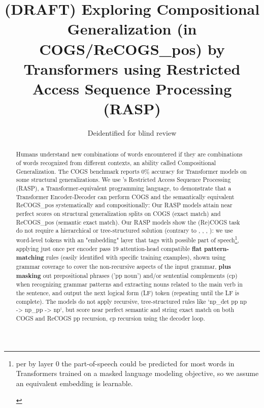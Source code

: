 \documentclass[11pt]{article}
\title{(DRAFT) Exploring Compositional Generalization (in COGS/ReCOGS\_pos) by Transformers using Restricted Access Sequence Processing (RASP)}
\author{Deidentified for blind review}
\begin{document}
\maketitle
\begin{abstract}
Humans understand new combinations of words encountered if they are combinations of words recognized from different contexts, an ability called Compositional Generalization.
The COGS benchmark \cite{KimLinzen2020} reports 0\% accuracy for Transformer models on some structural generalizations.
We use \cite{Weiss2021}'s Restricted Access Sequence Processing (RASP), a Transformer-equivalent programming language, to demonstrate that a Transformer Encoder-Decoder can perform COGS and the semantically equivalent ReCOGS\_pos\cite{Wu2023} systematically and compositionally: Our RASP models attain near perfect scores on structural generalization splits on COGS (exact match) and ReCOGS\_pos (semantic exact match).
Our RASP models show the (Re)COGS task do not require a hierarchical or tree-structured solution (contrary to \cite{KimLinzen2020}, \cite{yao-koller-2022-structural}, \cite{murty2022characterizingintrinsiccompositionalitytransformers}, \cite{liu-etal-2021-learning-algebraic}): we use word-level tokens with an "embedding" layer that tags with possible part of speech\footnote{\begin{footnotesize}per \cite{tenney2019bertrediscoversclassicalnlp} by layer 0 the part-of-speech could be predicted for most words in Transformers trained on a masked language modeling objective, so we assume an equivalent embedding is learnable.\end{footnotesize}}, applying just once per encoder pass 19 attention-head compatible \textbf{flat pattern-matching} rules (easily identified with specific training examples), shown using grammar coverage \cite{fuzzingbook2023:GrammarCoverageFuzzer} to cover the non-recursive aspects of the input grammar, \textbf{plus masking} out prepositional phrases ('pp noun') and/or sentential complements (cp) when recognizing grammar patterns and extracting nouns related to the main verb in the sentence, and output the next logical form (LF) token (repeating until the LF is complete). The models do not apply recursive, tree-structured rules like `np\_det pp np -> np\_pp -> np`, but score near perfect semantic and string exact match on both COGS and ReCOGS pp recursion, cp recursion using the decoder loop.
\end{abstract}
\end{document}
